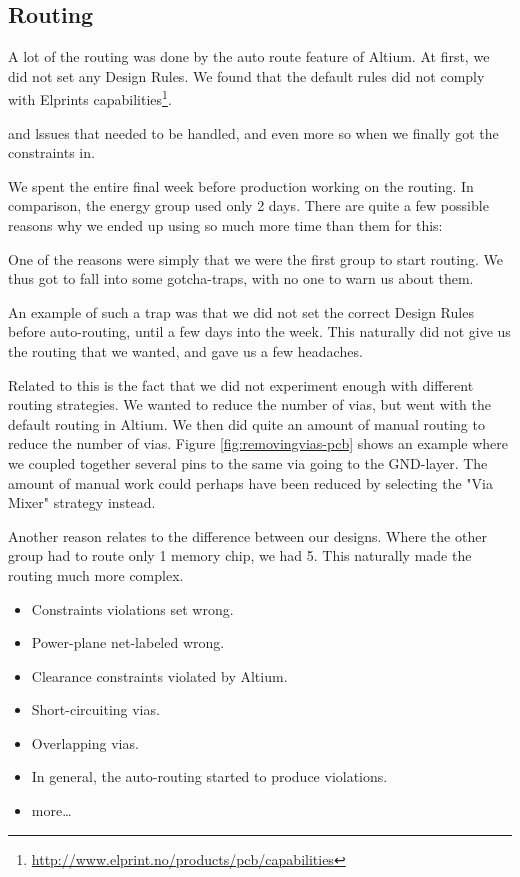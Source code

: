 \subsection {Routing}

A lot of the routing was done by the auto route feature of Altium. At first, we did not set any Design Rules. We found that the default rules did not comply with Elprints capabilities\footnote {\url{http://www.elprint.no/products/pcb/capabilities}}. 

and lssues that needed to be handled, and even more so when we finally got the constraints in.

We spent the entire final week before production working on the routing. In comparison, the energy group used only 2 days. There are quite a few possible reasons why we ended up using so much more time than them for this:

One of the reasons were simply that we were the first group to start routing. We thus got to fall into some gotcha-traps, with no one to warn us about them.

An example of such a trap was that we did not set the correct Design Rules before auto-routing, until a few days into the week. This naturally did not give us the routing that we wanted, and gave us a few headaches.

Related to this is the fact that we did not experiment enough with different routing strategies. We wanted to reduce the number of vias, but went with the default routing in Altium. We then did quite an amount of manual routing to reduce the number of vias. Figure \ref{fig:removingvias-pcb} shows an example where we coupled together several pins to the same via going to the GND-layer. The amount of manual work could perhaps have been reduced by selecting the "Via Mixer" strategy instead.


Another reason relates to the difference between our designs. Where the other group had to route only 1 memory chip, we had 5. This naturally made the routing much more complex.

\begin{itemize}
\item Constraints violations set wrong.
\item Power-plane net-labeled wrong.
\item Clearance constraints violated by Altium.
\item Short-circuiting vias.
\item Overlapping vias.
\item In general, the auto-routing started to produce violations.
\item more\ldots
\end{itemize}

